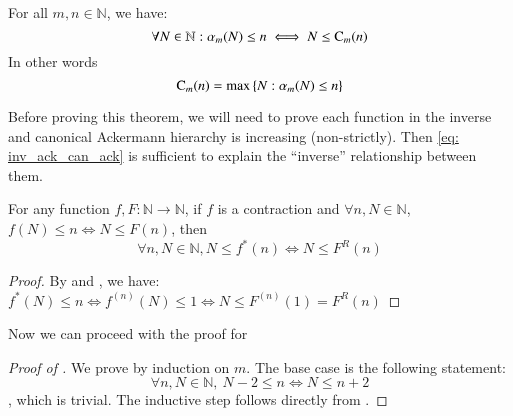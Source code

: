 \begin{thm} \label{thm: inv_ack_can_ack}
For all $m, n \in \mathbb{N}$, we have:
\begin{equation} \label{eq: inv_ack_can_ack}
\forall N \in \mathbb{N}: \alpha_m(N) \le n \iff N \le \text{C}_m(n)
\end{equation}
In other words
\begin{equation} \label{eq: inv_ack_can_ack_0}
\text{C}_m(n) = \max\left\{N : \alpha_m(N) \le n\right\}
\end{equation}
\end{thm}

Before proving this theorem, we will need to prove each 
function in the inverse and canonical Ackermann hierarchy 
is increasing (non-strictly). Then \eqref{eq: inv_ack_can_ack} 
is sufficient to explain the ``inverse'' relationship between them.

%
%
%
%

\begin{lem}  \label{lem: countdown_rep_app}
For any function $f, F: \mathbb{N} \to \mathbb{N}$, 
if $f$ is a contraction and $\forall n, N\in \mathbb{N}$, 
$f(N) \le n \iff N \le F(n)$, then
$$ \forall n, N\in \mathbb{N}, N\le f^*(n) \iff N \le F^R(n) $$
\end{lem}

\begin{proof}
By  and , we have:
$\displaystyle f^*(N)\le n \iff f^{(n)}(N) \le 1 \iff N \le F^{(n)}(1) = F^R(n) $
\end{proof}

Now we can proceed with the proof for 

\begin{proof}[Proof of ]
We prove by induction on $m$. The base case is the following statement:
$$ \forall n, N\in \mathbb{N}, \ N - 2\le n \iff N \le n + 2 $$
, which is trivial. The inductive step follows directly from .
\end{proof}

